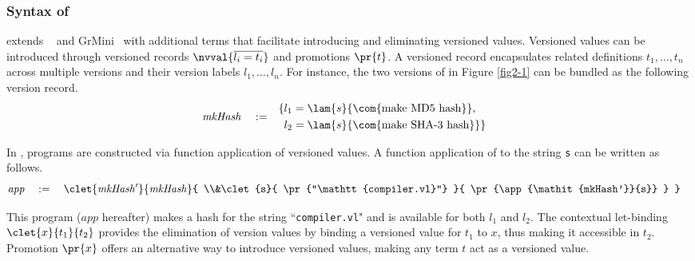 
\subsubsection{Syntax of \corelang{}}
\corelang{} extends \lrpcf{}~\cite{brunel_core_2014} and GrMini~\cite{Orchard:2019:Granule} with additional terms that facilitate introducing and eliminating versioned values.
Versioned values can be introduced through versioned records $\nvval{\overline{l_i=t_i}}$ and promotions $\pr{t}$.
A versioned record encapsulates related definitions $t_1,\ldots,t_n$ across multiple versions and their version labels $l_1,\ldots,l_n$.
For instance, the two versions of  in Figure \ref{fig2-1} can be bundled as the following version record.
\begin{align*}
\mathit{mkHash}\quad:=\quad
&
\begin{aligned}
    \{&l_1=\lam{s}{\textnormal{\com{make MD5 hash}}},\\
    &l_2=\lam{s}{\textnormal{\com{make SHA-3 hash}}}\}
\end{aligned}
\end{align*}

In \corelang{}, programs are constructed via function application of versioned values. A function application of  to the string \texttt{s} can be written as follows.
\begin{align*}
\mathit{app}\quad:=\quad
\begin{aligned}
&\clet{\mathit{mkHash'}}{\mathit{mkHash}}{
    \\&\clet{s}{
        \pr{``\mathtt{compiler.vl}"}
    }{
        \pr{\app{\mathit{mkHash'}}{s}}
    }
}
\end{aligned}
\end{align*}

This program ($app$ hereafter) makes a hash for the string ``\texttt{compiler.vl}" and is available for both $l_1$ and $l_2$.
The contextual let-binding $\clet{x}{t_1}{t_2}$ provides the elimination of version values by binding a versioned value for $t_1$ to $x$, thus making it accessible in $t_2$.
Promotion $\pr{x}$ offers an alternative way to introduce versioned values, making any term $t$ act as a versioned value.

